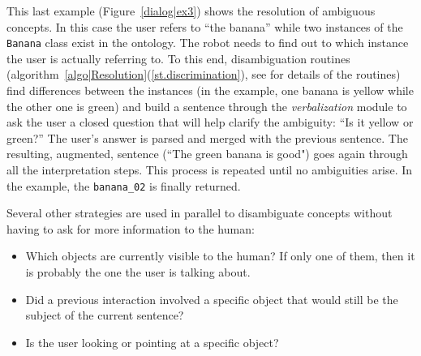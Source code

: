 \documentclass{svmult}
\newcommand{\concept}[1]{{\footnotesize \texttt{#1}}}
\begin{document}
This last example (Figure~\ref{dialog|ex3}) shows the resolution of ambiguous
concepts. In this case the user refers to ``the banana'' while two instances of 
the \concept{Banana} class exist in the ontology. The robot needs to find out
to which instance the user is actually referring to. To this end,
disambiguation routines (algorithm~\ref{algo|Resolution}(\ref{st.discrimination}), see \cite{Ros2010b} for details of the routines)
find differences between the instances (in the example, one banana is yellow
while the other one is green) and build a sentence through the
\emph{verbalization} module to ask the user a closed question that will
help clarify the ambiguity: ``Is it yellow or green?'' The user's answer is
parsed and merged with the previous sentence. The resulting, augmented,
sentence (``The green banana is good") goes again through all the
interpretation steps. This process is repeated until no ambiguities arise. 
In the example, the \concept{banana\_02} is finally returned.


Several other strategies are used in parallel to disambiguate concepts without
having to ask for more information to the human:

\begin{itemize}
	\item Which objects are currently visible to the human? If only one of
	them, then it is probably the one the user is talking about. 
	\item Did a previous interaction involved a specific object that would
	still be the subject of the current sentence?
	\item Is the user looking or pointing at a specific object?
\end{itemize}

\end{document}
